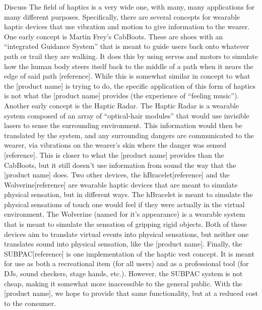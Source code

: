 Discuss The field of haptics is a very wide one, with many, many applications for many different purposes. Specifically, there are several concepts for wearable haptic devices that use vibration and motion to give information to the wearer. One early concept is Martin Frey’s CabBoots. These are shoes with an “integrated Guidance System” that is meant to guide users back onto whatever path or trail they are walking. It does this by using servos and motors to simulate how the human body steers itself back to the middle of a path when it nears the edge of said path [reference]. While this is somewhat similar in concept to what the [product name] is trying to do, the specific application of this form of haptics is not what the [product name] provides (the experience of “feeling music”). Another early concept is the Haptic Radar. The Haptic Radar is a wearable system composed of an array of “optical-hair modules” that would use invisible lasers to sense the surrounding environment. This information would then be translated by the system, and any surrounding dangers are communicated to the wearer, via vibrations on the wearer’s skin  where the danger was sensed [reference]. This is closer to what the [product name] provides than the CabBoots, but it still doesn’t use information from sound the way that the [product name] does. Two other devices, the hBracelet[reference] and the Wolverine[reference] are wearable haptic devices that are meant to simulate physical sensation, but in different ways. The hBracelet is meant to simulate the physical sensations of touch one would feel if they were actually in the virtual environment. The Wolverine (named for it’s appearance) is a wearable system that is meant to simulate the sensation of gripping rigid objects. Both of these devices aim to translate virtual events into physical sensations, but neither one translates sound into physical sensation, like the [product name]. Finally, the SUBPAC[reference] is one implementation of the haptic vest concept. It is meant for use as both a recreational item (for all users) and as a professional tool (for DJs, sound checkers, stage hands, etc.). However, the SUBPAC system is not cheap, making it somewhat more inaccessible to the general public. With the [product name], we hope to provide that same functionality, but at a reduced cost to the consumer.